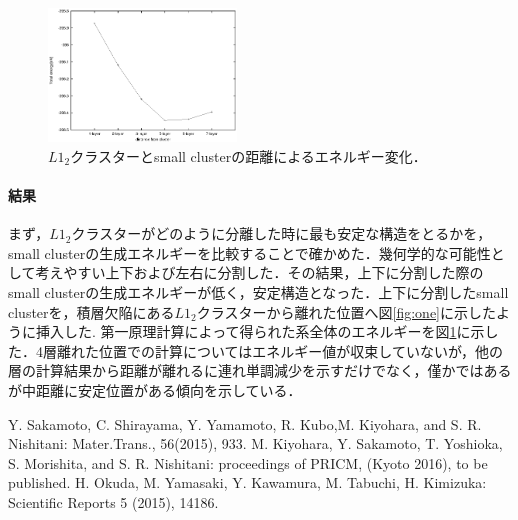 \documentclass[12pt, a4paper]{jarticle}
\newcommand{\講演番号}
{14pPSA-18}
\newcommand{\講演題目}
{Mg-LPSOのL\mbox{\boldmath $1_2$} クラスターの第一原理計算}
\newcommand{\英文題目}
{First principle calculations of L1$_2$ Cluster in Mg-Zn-Y alloy}
\newcommand{\和文所属}
{関西学院大・理工}
\newcommand{\和文氏名}
{西谷滋人, 清原資之, 森下慎也}
\newcommand{\英文所属}
{Department of Informatics, Kwansei Gakuin Univ}
\newcommand{\英文氏名}
{S. R. Nishitani, M. Kiyohara, and S. Morishita}
\newlength\題目幅
\newlength\ヘッダ項目間隔
\newlength\所属インデント
\newlength\和文氏名インデント
\newlength\英文氏名インデント
\newlength\最小所属氏名間隔
\newlength\ヘッダ行間隔
\newlength\本文行間隔
\newlength\上端余白
\newlength\左端余白
\begin{document}
\begin{figure}
\vspace{\baselineskip}
\begin{center}
   \includegraphics[width=50mm]{./small_cluster.eps}
  \caption{$L1_2$クラスターとsmall clusterの距離によるエネルギー変化．}
  \label{fig:two}
\end{center}
\vspace{-2\baselineskip}
\end{figure}
\vspace{-1\baselineskip}
\paragraph{結果}
まず，$L1_2$クラスターがどのように分離した時に最も安定な構造をとるかを，small clusterの生成エネルギーを比較することで確かめた．幾何学的な可能性として考えやすい上下および左右に分割した．その結果，上下に分割した際のsmall clusterの生成エネルギーが低く，安定構造となった．上下に分割したsmall clusterを，積層欠陥にある$L1_2$クラスターから離れた位置へ図\ref{fig:one}に示したように挿入した. 第一原理計算によって得られた系全体のエネルギーを図\ref{fig:two}に示した．4層離れた位置での計算についてはエネルギー値が収束していないが，他の層の計算結果から距離が離れるに連れ単調減少を示すだけでなく，僅かではあるが中距離に安定位置がある傾向を示している．

{\small\setlength\baselineskip{10pt}	%
\begin{thebibliography}{9}
Y. Sakamoto, C. Shirayama, Y. Yamamoto, R. Kubo,M. Kiyohara, and S. R. Nishitani: Mater.Trans., 56(2015), 933.
 M. Kiyohara, Y. Sakamoto, T. Yoshioka, S. Morishita, and S. R. Nishitani: proceedings of PRICM, (Kyoto 2016), to be published.
H. Okuda, M. Yamasaki, Y. Kawamura, M. Tabuchi, H. Kimizuka: Scientific Reports 5 (2015), 14186.
\end{thebibliography}
}
\end{document}
